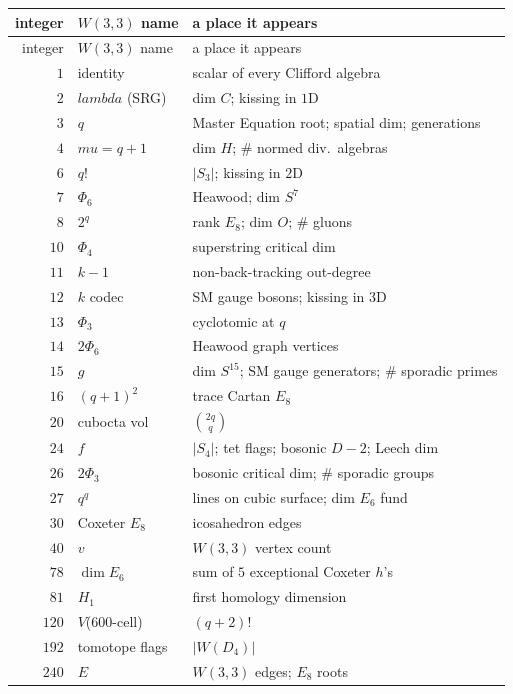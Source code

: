 \documentclass[11pt]{article}
\def\mathbb#1{#1}%
\def\lambda{lambda}%
\def\mu{mu}%
\def\Phi#1{Phi#1}%
\begin{document}
{\renewcommand{\arraystretch}{1.05}
\begin{longtable}{r l l}
\toprule
integer & $W(3,3)$ name & a place it appears \\
\midrule
\endfirsthead
\toprule
integer & $W(3,3)$ name & a place it appears \\
\midrule
\endhead
\bottomrule
\endfoot
\bottomrule
\endlastfoot
$1$ & identity & scalar of every Clifford algebra \\
$2$ & $\lambda$ (SRG) & dim $\mathbb{C}$; kissing in $1$D \\
$3$ & $q$ & Master Equation root; spatial dim; generations \\
$4$ & $\mu = q + 1$ & dim $\mathbb{H}$; \# normed div.\ algebras \\
$6$ & $q!$ & $|S_3|$; kissing in $2$D \\
$7$ & $\Phi_6$ & Heawood; dim $S^7$ \\
$8$ & $2^q$ & rank $E_8$; dim $\mathbb{O}$; \# gluons \\
$10$ & $\Phi_4$ & superstring critical dim \\
$11$ & $k - 1$ & non-back-tracking out-degree \\
$12$ & $k$ codec & SM gauge bosons; kissing in $3$D \\
$13$ & $\Phi_3$ & cyclotomic at $q$ \\
$14$ & $2\Phi_6$ & Heawood graph vertices \\
$15$ & $g$ & dim $S^{15}$; SM gauge generators; \# sporadic primes \\
$16$ & $(q+1)^2$ & trace Cartan $E_8$ \\
$20$ & cubocta vol & $\binom{2q}{q}$ \\
$24$ & $f$ & $|S_4|$; tet flags; bosonic $D - 2$; Leech dim \\
$26$ & $2\Phi_3$ & bosonic critical dim; \# sporadic groups \\
$27$ & $q^q$ & lines on cubic surface; dim $E_6$ fund \\
$30$ & Coxeter $E_8$ & icosahedron edges \\
$40$ & $v$ & $W(3,3)$ vertex count \\
$78$ & $\dim E_6$ & sum of $5$ exceptional Coxeter $h$'s \\
$81$ & $H_1$ & first homology dimension \\
$120$ & $V$($600$-cell) & $(q+2)!$ \\
$192$ & tomotope flags & $|W(D_4)|$ \\
$240$ & $E$ & $W(3,3)$ edges; $E_8$ roots \\

\end{longtable}}
\end{document}
